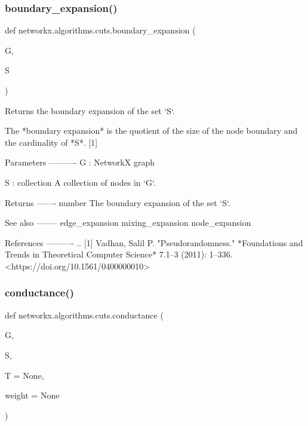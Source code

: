 \subsubsection{\texorpdfstring{boundary\+\_\+expansion()}{boundary\_expansion()}}
{\footnotesize\ttfamily def networkx.\+algorithms.\+cuts.\+boundary\+\_\+expansion (\begin{DoxyParamCaption}\item[{}]{G,  }\item[{}]{S }\end{DoxyParamCaption})}

\begin{DoxyVerb}Returns the boundary expansion of the set `S`.

The *boundary expansion* is the quotient of the size
of the node boundary and the cardinality of *S*. [1]

Parameters
----------
G : NetworkX graph

S : collection
    A collection of nodes in `G`.

Returns
-------
number
    The boundary expansion of the set `S`.

See also
--------
edge_expansion
mixing_expansion
node_expansion

References
----------
.. [1] Vadhan, Salil P.
       "Pseudorandomness."
       *Foundations and Trends in Theoretical Computer Science*
       7.1–3 (2011): 1–336.
       <https://doi.org/10.1561/0400000010>\end{DoxyVerb}
 \mbox{\label{namespacenetworkx_1_1algorithms_1_1cuts_a96f7d141bb0ecb21b2da6f642484b84a}} 
\subsubsection{\texorpdfstring{conductance()}{conductance()}}
{\footnotesize\ttfamily def networkx.\+algorithms.\+cuts.\+conductance (\begin{DoxyParamCaption}\item[{}]{G,  }\item[{}]{S,  }\item[{}]{T = {\ttfamily None},  }\item[{}]{weight = {\ttfamily None} }\end{DoxyParamCaption})}

